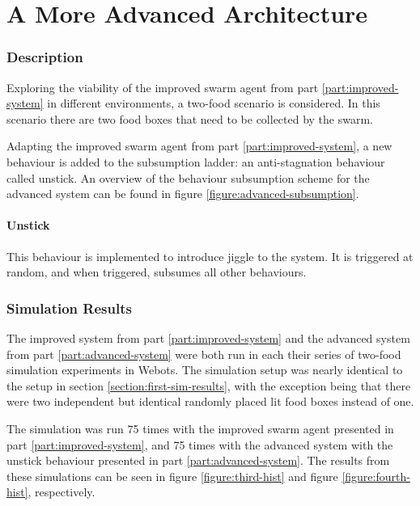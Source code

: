 \documentclass[a4paper]{article}
\begin{document}
\part{A More Advanced Architecture}
\label{part:advanced-system}

\section{Description}

Exploring the viability of the improved swarm agent from part \vref{part:improved-system} in different environments, a two-food scenario is considered.
In this scenario there are two food boxes that need to be collected by the swarm.

Adapting the improved swarm agent from part \ref{part:improved-system}, a new behaviour is added to the subsumption ladder: an anti-stagnation behaviour called unstick.
An overview of the behaviour subsumption scheme for the advanced system can be found in figure \vref{figure:advanced-subsumption}.

\subsection{Unstick}
This behaviour is implemented to introduce jiggle to the system. It is triggered at random, and when triggered, subsumes all other behaviours. 



\section{Simulation Results}

The improved system from part \ref{part:improved-system} and the advanced system from part \vref{part:advanced-system} were both run in each their series of two-food simulation experiments in Webots.
The simulation setup was nearly identical to the setup in section \vref{section:first-sim-results}, with the exception being that there were two independent but identical randomly placed lit food boxes instead of one.

The simulation was run 75 times with the improved swarm agent presented in part \vref{part:improved-system}, and 75 times with the advanced system with the unstick behaviour presented in part \vref{part:advanced-system}.
The results from these simulations can be seen in figure \vref{figure:third-hist} and figure \vref{figure:fourth-hist}, respectively.
\end{document}

